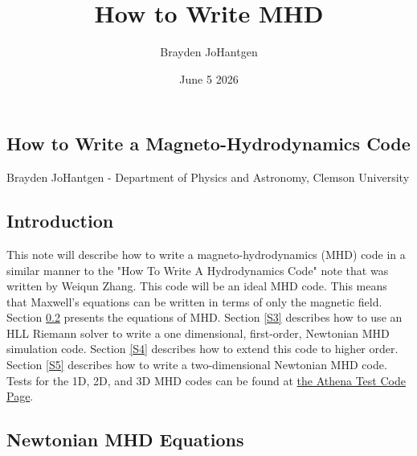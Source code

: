 \documentclass{article}
\title{How to Write MHD}
\author{Brayden JoHantgen}
\date{June 5 2026}
\begin{document}
\setlength{\parindent}{20pt}

\begin{center}
    \section*{How to Write a Magneto-Hydrodynamics Code}
    Brayden JoHantgen - Department of Physics and Astronomy, Clemson University
    \vspace{4mm}
    \subsection{Introduction}\label{S1}
\end{center}

This note will describe how to write a magneto-hydrodynamics (MHD) code in a similar manner to the "How To Write A Hydrodynamics Code" note that was written by Weiqun Zhang. This code will be an ideal MHD code. This means that Maxwell's equations can be written in terms of only the magnetic field. Section \ref{S2} presents the equations of MHD. Section \ref{S3} describes how to use an HLL Riemann solver to write a one dimensional, first-order, Newtonian MHD simulation code. Section \ref{S4} describes how to extend this code to higher order. Section \ref{S5} describes how to write a two-dimensional Newtonian MHD code. Tests for the 1D, 2D, and 3D MHD codes can be found at \href{https://www.astro.princeton.edu/~jstone/Athena/tests/}{the Athena Test Code Page}.
\vspace{6mm}
\begin{center}
    \subsection{Newtonian MHD Equations}\label{S2}
\end{center}
\end{document}
